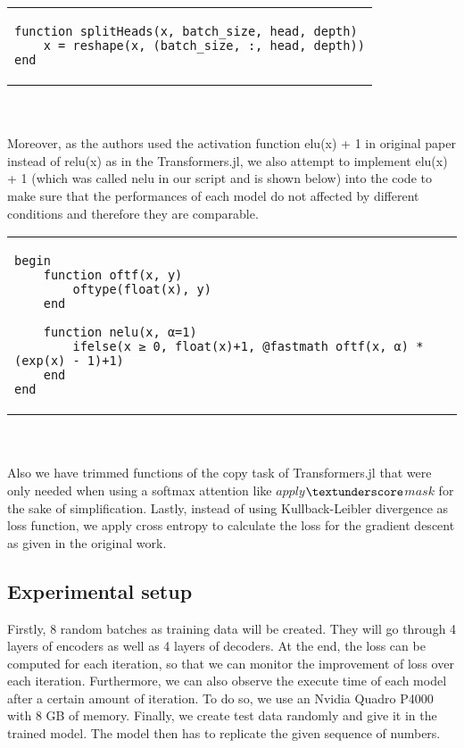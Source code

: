 \documentclass[DIV=13,fontsize=11pt]{scrartcl}
\begin{document}
\begin{tabular}{b}
\begin{verbatim}
function splitHeads(x, batch_size, head, depth)
    x = reshape(x, (batch_size, :, head, depth))
end
\end{verbatim}
\end{tabular} \\

\\ Moreover, as the authors used the activation function elu(x) + 1 in original paper instead of relu(x) as in the Transformers.jl, we also attempt to implement elu(x) + 1 (which was called nelu in our script and is shown below) into the code to make sure that the performances of each model do not affected by different conditions and therefore they are comparable. 

\begin{tabular}{b}
\begin{verbatim}
begin
    function oftf(x, y)
        oftype(float(x), y)
    end
    
    function nelu(x, α=1)
        ifelse(x ≥ 0, float(x)+1, @fastmath oftf(x, α) * (exp(x) - 1)+1)
    end
end
\end{verbatim}
\end{tabular} \\

\\ Also we have trimmed functions of the copy task of Transformers.jl that were only needed when using a softmax attention like  \(apply\)\(\textunderscore\)\(mask\) for the sake of simplification. Lastly, instead of using Kullback-Leibler divergence as loss function, we apply cross entropy to calculate the loss for the gradient descent as given in the original work.



\subsection{Experimental setup}
Firstly, 8 random batches as training data will be created. They will go through 4 layers of encoders as well as 4 layers of decoders. At the end, the loss can be computed for each iteration, so that we can monitor the improvement of loss over each iteration. Furthermore, we can also observe the execute time of each model after a certain amount of iteration. To do so, we use an Nvidia Quadro P4000 with 8 GB of memory. Finally, we create test data randomly and give it in the trained model. The model then has to replicate the given sequence of numbers.
\end{document}
